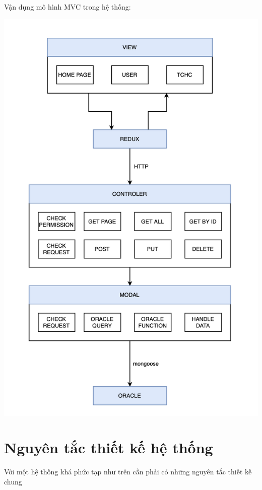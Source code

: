 Vận dụng mô hình MVC trong hệ thống:
\begin{center}
  \captionsetup{type=figure}
  \includegraphics[width=15cm]{img/MVCInTchc.png}
\end{center}

\section{Nguyên tắc thiết kế hệ thống}
\indent Với một hệ thống khá phức tạp như trên cần phải có những nguyên tắc thiết kế chung
